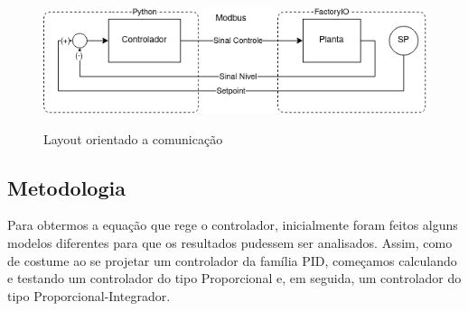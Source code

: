 \documentclass[
	article,			%
	11pt,				%
	oneside,			%
	a4paper,			%
	section=TITLE,		%
	english,			%
	brazil,				%
	sumario=tradicional
	]{abntex2}
\begin{document}
    
    
    
    


\begin{figure}[H]
    \centering
    \caption{Layout orientado a comunicação}
    \includegraphics[width=\textwidth]{img/arq-comm.png}
    \label{fig:arq-comm}
\end{figure}

\subsection{Metodologia}
    Para obtermos a equação que rege o controlador, inicialmente foram feitos alguns modelos diferentes para que os resultados pudessem ser analisados. Assim, como de costume ao se projetar um controlador da família PID, começamos calculando e testando um controlador do tipo Proporcional e, em seguida, um controlador do tipo Proporcional-Integrador.
    
\end{document}
